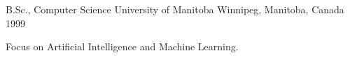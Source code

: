 

\begin{cventries}

  \cventry
    {B.Sc., Computer Science} %
    {University of Manitoba} %
    {Winnipeg, Manitoba, Canada} %
    {1999} %
    {
      \begin{cvitems} %
        \item {Focus on Artificial Intelligence and Machine Learning.}
      \end{cvitems}
    }

\end{cventries}
